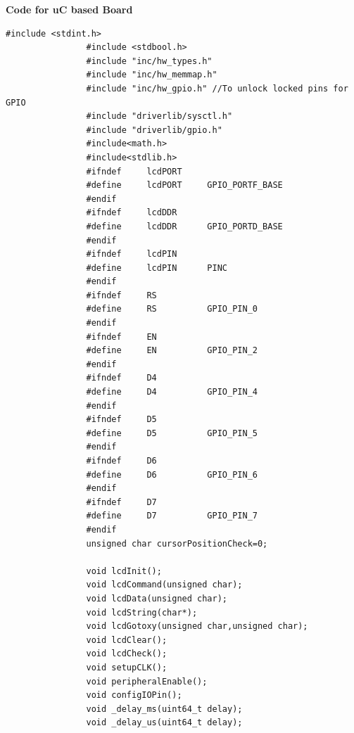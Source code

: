 \documentclass[a4paper,10pt,oneside]{article}
\begin{document}
			\textbf{Code for uC based Board}
			\begin{lstlisting}[style=CStyle]
				#include <stdint.h>
				#include <stdbool.h>
				#include "inc/hw_types.h"
				#include "inc/hw_memmap.h"
				#include "inc/hw_gpio.h" //To unlock locked pins for GPIO
				#include "driverlib/sysctl.h"
				#include "driverlib/gpio.h"
				#include<math.h>
				#include<stdlib.h>
				#ifndef     lcdPORT
				#define     lcdPORT     GPIO_PORTF_BASE
				#endif
				#ifndef     lcdDDR
				#define     lcdDDR      GPIO_PORTD_BASE
				#endif
				#ifndef     lcdPIN
				#define     lcdPIN      PINC
				#endif
				#ifndef     RS
				#define     RS          GPIO_PIN_0
				#endif
				#ifndef     EN
				#define     EN          GPIO_PIN_2
				#endif
				#ifndef     D4
				#define     D4          GPIO_PIN_4
				#endif
				#ifndef     D5
				#define     D5          GPIO_PIN_5
				#endif
				#ifndef     D6
				#define     D6          GPIO_PIN_6
				#endif
				#ifndef     D7
				#define     D7          GPIO_PIN_7
				#endif
				unsigned char cursorPositionCheck=0;
				
				void lcdInit();
				void lcdCommand(unsigned char);
				void lcdData(unsigned char);
				void lcdString(char*);
				void lcdGotoxy(unsigned char,unsigned char);
				void lcdClear();
				void lcdCheck();
				void setupCLK();
				void peripheralEnable();
				void configIOPin();
				void _delay_ms(uint64_t delay);
				void _delay_us(uint64_t delay);
				

\end{lstlisting}
\end{document}
